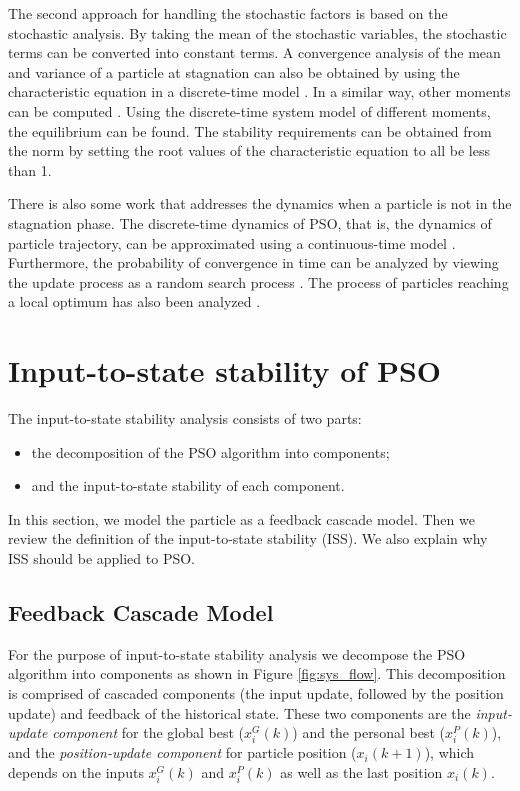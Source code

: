 \documentclass{sig-alternate}
\begin{document}
The second approach for handling the stochastic factors is based on the stochastic analysis.
By taking the mean of the stochastic variables, the stochastic terms can be converted into
constant terms.
A convergence analysis of the mean and variance of a particle at stagnation can also be obtained by using the characteristic equation in a discrete-time model 
\cite{Jiang20078}.
In a similar way, 
other moments can be computed
\cite{5175367,Poli:2007:EAS:1276958.1276977,Poli:2008:DSS:1384929.1384944}.
Using the discrete-time system model of different moments, the equilibrium can be found.
The stability requirements can be obtained from the norm by setting the root values of the characteristic equation to all be less than 1.

There is also some work that addresses the dynamics when a particle is not in the stagnation phase.
The discrete-time dynamics of PSO, that is, the dynamics of particle trajectory, can be approximated
using a continuous-time model
\cite{5675669}.
Furthermore, the probability of convergence in time can be analyzed
by viewing the update process as a random search process
\cite{vandenBergh:2010:CPP:2010420.2010421}.
The process of particles reaching a local optimum
has also been analyzed
\cite{Schmitt:2013:PSO:2463372.2463563}.

\section{Input-to-state stability of PSO}
\label{sec:sys_model}

The input-to-state stability analysis consists of two parts:
\begin{itemize}
\item the decomposition of the PSO algorithm into components;
\item and the input-to-state stability of each component.
\end{itemize}
In this section, we model the particle as a feedback cascade model.
Then we review the definition of the input-to-state stability (ISS).
We also explain why ISS should be applied to PSO.

\subsection{Feedback Cascade Model}
\label{sec:feedback_cascade_model}

For the purpose of input-to-state stability analysis we decompose the PSO algorithm into components as shown in Figure \ref{fig:sys_flow}. This decomposition is comprised of cascaded components (the input update, followed by the position update) and feedback of the historical state.
These two components are the 
\emph{input-update component} for the global best ($ x^{G}_{i}(k) $) and the personal best ($ x^{P}_{i}(k) $), and the 
\emph{position-update component} for particle position ($ x_{i}(k+1) $), which depends on the inputs $ x^{G}_{i}(k) $ and $ x^{P}_{i}(k) $ as well as the last position $ x_{i}(k) $.
\end{document}
